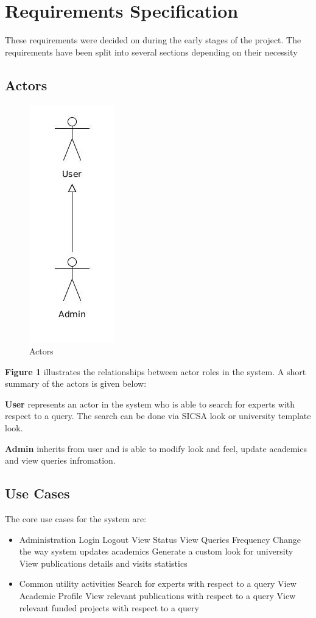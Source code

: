 
\section{Requirements Specification}
These requirements were decided on during the early stages of the project. The requirements have been split into several 
sections depending on their necessity

\subsection{Actors}

\begin{figure}
\centering
\includegraphics[scale=0.4]{./figures/actors.jpg}
\caption{Actors}
\end{figure}

\textbf{Figure 1} illustrates the relationships between actor roles in the system. A short summary of the actors is given below:

\textbf{User} represents an actor in the system who is able to search for experts with respect to a query. The search can be done via SICSA look
or university template look.

\textbf{Admin} inherits from user and is able to modify look and feel, update academics and view queries infromation.

\subsection{Use Cases}
The core use cases for the system are:
\begin{itemize}
 \item Administration
 \subitem Login
 \subitem Logout
 \subitem View Status
 \subitem View Queries Frequency
 \subitem Change the way system updates academics
 \subitem Generate a custom look for university
 \subitem View publications details and visits statistics
 
 \item Common utility activities
 \subitem Search for experts with respect to a query
 \subitem View Academic Profile
 \subitem View relevant publications with respect to a query
 \subitem View relevant funded projects with respect to a query
\end{itemize}

